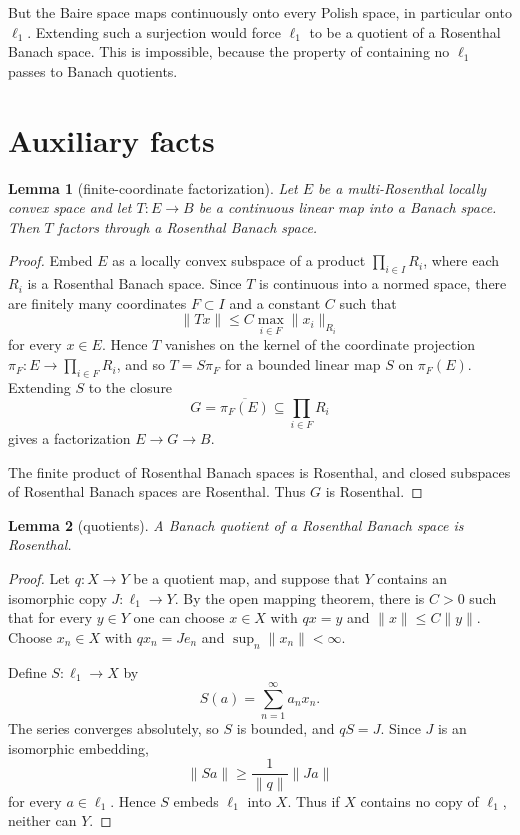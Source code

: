 \documentclass[11pt]{article}
\newtheorem{lemma}{Lemma}
\begin{document}
But the Baire space maps continuously onto every Polish space, in particular
onto \(\ell_1\).  Extending such a surjection would force \(\ell_1\) to be a
quotient of a Rosenthal Banach space.  This is impossible, because the property
of containing no \(\ell_1\) passes to Banach quotients.

\section*{Auxiliary facts}

\begin{lemma}[finite-coordinate factorization]
\label{lem:factor}
Let \(E\) be a multi-Rosenthal locally convex space and let
\(T:E\to B\) be a continuous linear map into a Banach space.  Then \(T\)
factors through a Rosenthal Banach space.
\end{lemma}

\begin{proof}
Embed \(E\) as a locally convex subspace of a product
\(\prod_{i\in I} R_i\), where each \(R_i\) is a Rosenthal Banach space.  Since
\(T\) is continuous into a normed space, there are finitely many coordinates
\(F\subset I\) and a constant \(C\) such that
\[
 \|Tx\|\le C\max_{i\in F}\|x_i\|_{R_i}
\]
for every \(x\in E\).  Hence \(T\) vanishes on the kernel of the coordinate
projection \(\pi_F:E\to \prod_{i\in F}R_i\), and so \(T=S\pi_F\) for a bounded
linear map \(S\) on \(\pi_F(E)\).  Extending \(S\) to the closure
\[
G=\overline{\pi_F(E)}\subseteq \prod_{i\in F}R_i
\]
gives a factorization \(E\to G\to B\).

The finite product of Rosenthal Banach spaces is Rosenthal, and closed
subspaces of Rosenthal Banach spaces are Rosenthal.  Thus \(G\) is Rosenthal.
\end{proof}

\begin{lemma}[quotients]
\label{lem:quotient}
A Banach quotient of a Rosenthal Banach space is Rosenthal.
\end{lemma}

\begin{proof}
Let \(q:X\to Y\) be a quotient map, and suppose that \(Y\) contains an
isomorphic copy \(J:\ell_1\to Y\).  By the open mapping theorem, there is
\(C>0\) such that for every \(y\in Y\) one can choose \(x\in X\) with
\(qx=y\) and \(\|x\|\le C\|y\|\).  Choose \(x_n\in X\) with
\(qx_n=J e_n\) and \(\sup_n\|x_n\|<\infty\).

Define \(S:\ell_1\to X\) by
\[
S(a)=\sum_{n=1}^{\infty} a_n x_n .
\]
The series converges absolutely, so \(S\) is bounded, and \(qS=J\).  Since
\(J\) is an isomorphic embedding,
\[
\|Sa\|\ge \frac{1}{\|q\|}\|J a\|
\]
for every \(a\in\ell_1\).  Hence \(S\) embeds \(\ell_1\) into \(X\).  Thus if
\(X\) contains no copy of \(\ell_1\), neither can \(Y\).
\end{proof}
\end{document}
